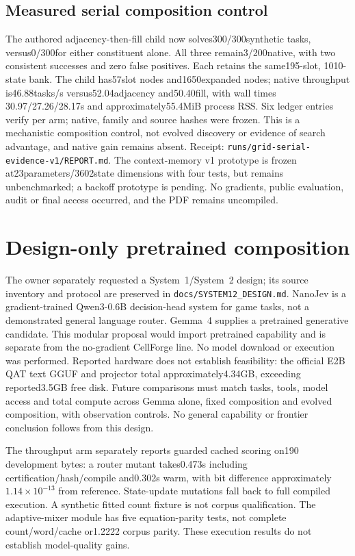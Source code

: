 \documentclass[11pt]{article}
\begin{document}
\subsection{Measured serial composition control}
The authored adjacency-then-fill child now solves300/300synthetic tasks,
versus0/300for either constituent alone. All three remain3/200native, with two
consistent successes and zero false positives. Each retains the same195-slot,
1010-state bank. The child has57slot nodes and1650expanded nodes; native
throughput is46.88tasks/s versus52.04adjacency and50.40fill, with wall times
30.97/27.26/28.17s and approximately55.4MiB process RSS. Six ledger entries
verify per arm; native, family and source hashes were frozen.
This is a mechanistic composition control, not evolved discovery or evidence
of search advantage, and native gain remains absent. Receipt:
\texttt{runs/grid-serial-evidence-v1/REPORT.md}. The context-memory v1 prototype
is frozen at23parameters/3602state dimensions with four tests, but remains
unbenchmarked; a backoff prototype is pending. No gradients, public evaluation,
audit or final access occurred, and the PDF remains uncompiled.

\section{Design-only pretrained composition}
The owner separately requested a System~1/System~2 design; its source inventory
and protocol are preserved in \texttt{docs/SYSTEM12\_DESIGN.md}. NanoJev is a
gradient-trained Qwen3-0.6B decision-head system for game tasks, not a demonstrated
general language router. Gemma~4 supplies a pretrained generative candidate.
This modular proposal would import pretrained capability and is separate from
the no-gradient CellForge line. No model download or execution was performed.
Reported hardware does not establish feasibility: the official E2B QAT text
GGUF and projector total approximately4.34GB, exceeding reported3.5GB free disk.
Future comparisons must match tasks, tools, model access and total compute across
Gemma alone, fixed composition and evolved composition, with observation controls.
No general capability or frontier conclusion follows from this design.

The throughput arm separately reports guarded cached scoring on190 development
bytes: a router mutant takes0.473s including certification/hash/compile and0.302s
warm, with bit difference approximately$1.14\times10^{-13}$ from reference.
State-update mutations fall back to full compiled execution. A synthetic fitted
count fixture is not corpus qualification. The adaptive-mixer module has five
equation-parity tests, not complete count/word/cache or1.2222 corpus parity.
These execution results do not establish model-quality gains.
\end{document}
